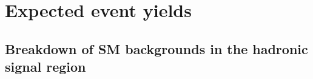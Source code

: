 \section{Expected event yields}
\label{sec:yields}

%

\subsection{Breakdown of SM backgrounds in the hadronic signal
  region\label{sec:bkgd-comp}}


